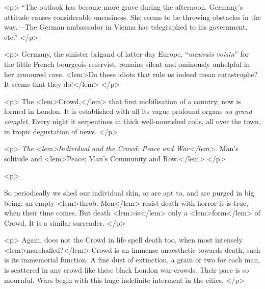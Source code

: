 				\medskip
				<p>
					“The outlook has become more grave during the afternoon. Germany's attitude causes 
					considerable uneasiness. She seems to be throwing obstacles in the way.---The 
					German ambassador in Vienna has telegraphed to his government, etc.” 
				</p>

				<p>
					Germany, the sinister brigand of latter-day Europe, “\emph{mauvais voisin}” for the little 
					French bourgeois-reservist, remains silent and ominously unhelpful in her armoured 
					cave. 
<lem>Do these idiots that rule us indeed mean catastrophe? It seems that they do!</lem>
						{}  
 				</p>

				<p>
					The 
<lem>Crowd,</lem>
						{} 
					that first mobilisation of a country, now is formed in London. It is 
					established with all its vague profound organs \emph{au grand complet}. Every night it serpentines 
					in thick well-nourished coils, all over the town, in tropic degustation of news. 
 				</p>

				<p>
					\emph{The 
<lem>Individual and the Crowd: Peace and War</lem>{}.}  
					Man's solitude and 
<lem>Peace; Man's Community and Row.</lem>
						{} 
				</p>
	
				<p>
					
					So periodically we shed our individual skin, or are apt to, and are purged in big 
					being: an empty 
<lem>throb. Men</lem>
						{} 
					resist death with horror it is true, when their time comes. But death 
<lem>is</lem>
						{} 
					only 
					a 
<lem>form</lem>
						{} 
					of Crowd. It is a similar surrender.   
 				</p>

				<p>
					Again, does not the Crowd in life spell death too, when most intensely 
<lem>marshalled?</lem>
						{} 
					Crowd is an immense anaesthetic towards death, such is its immemorial function. 
					A fine dust of extinction, a grain or two for each man, is scattered in any 
					crowd like these black London war-crowds. Their pace is so mournful. Wars begin with 
					this huge indefinite interment in the cities. 
 				</p>


